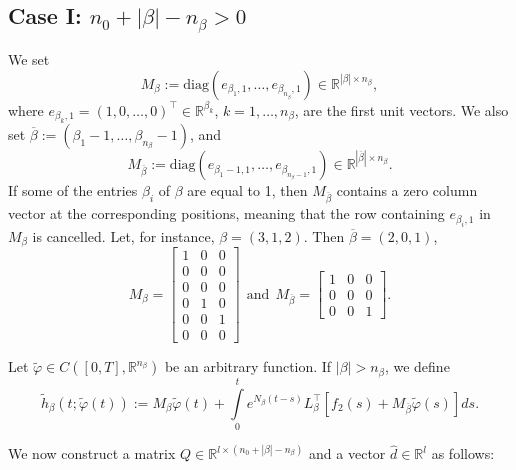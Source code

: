 \documentclass[preprint,12pt]{elsarticle}
\numberwithin{equation}{section}
\theoremstyle{definition}
\begin{document}
\subsection{Case I: \( n_0 + |\beta| - n_{\beta} > 0 \)}

We set
\begin{equation*}
    M_{\beta}:=\text{diag}\left(e_{\beta_1,1},\ldots, e_{\beta_{n_{\beta}},1}\right)\in\mathbb{R}^{|\beta|\times n_{\beta}},
\end{equation*}
where $e_{\beta_k,1}=(1,0,\ldots,0)^\top\in\mathbb{R}^{\beta_k}$, $k=1,\ldots,n_{\beta}$,
are the first unit vectors. We also set $\overline{\beta}:=(\beta_1-1,\ldots,\beta_{n_{\beta}}-1)$, and
\begin{equation*}
    M_{\overline{\beta}}:=\text{diag}\left(e_{\beta_1-1,1},\ldots, e_{\beta_{n_{\beta}-1},1}\right)\in\mathbb{R}^{|\overline{\beta}|\times n_{\beta}}.
\end{equation*}
If some of the entries $\beta_i$ of $\beta$ are equal to 1, then $ M_{\overline{\beta}}$ contains a zero column vector at the corresponding positions, meaning that the row containing $e_{\beta_i,1}$ in $M_{\beta}$ is cancelled. Let, for instance, $\beta=(3,1,2)$. Then $\overline{\beta}=(2,0,1)$,
\begin{equation*}
    M_{\beta}=\begin{bmatrix}
        1&0&0\\0&0&0\\0&0&0\\0&1&0\\0&0&1\\0&0&0
    \end{bmatrix}~~\text{and} ~~M_{\overline{\beta}}=\begin{bmatrix}
        1&0&0\\0&0&0\\0&0&1
    \end{bmatrix}.
\end{equation*}

Let $\widetilde{\varphi}\in C([0,T],\mathbb{R}^{n_{\beta}})$ be an arbitrary function. If $|\beta|>n_\beta$, we define
\begin{equation*}
\label{h_beta_GEN}
\widetilde{h}_{\beta}(t; \widetilde{\varphi}(t)):=M_{\beta}\widetilde{\varphi}(t)+\int\limits_0^t e^{N_{\beta}(t-s)}L_{\beta}^\top\left[f_2(s)+M_{\bar{\beta}}\widetilde{\varphi}(s)\right]ds
.
\end{equation*}



We now construct a matrix \( Q \in \mathbb{R}^{l \times (n_0 + |\beta| - n_{\beta})} \) and a vector \( \widehat{d} \in \mathbb{R}^{l} \) as follows:
\end{document}
